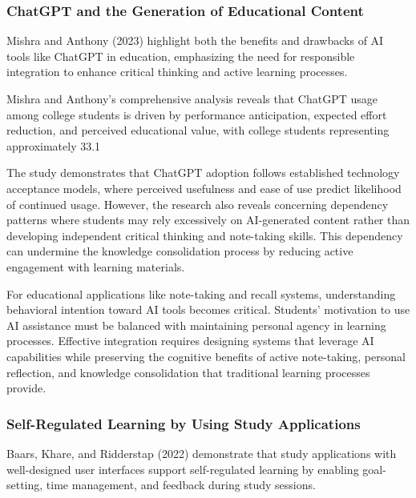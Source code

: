 \subsubsection{ChatGPT and the Generation of Educational Content}

Mishra and Anthony (2023) highlight both the benefits and drawbacks of AI tools like ChatGPT in education, emphasizing the need for responsible integration to enhance critical thinking and active learning processes.

{\color{maroon}
Mishra and Anthony's comprehensive analysis reveals that ChatGPT usage among college students is driven by performance anticipation, expected effort reduction, and perceived educational value, with college students representing approximately 33.1%

The study demonstrates that ChatGPT adoption follows established technology acceptance models, where perceived usefulness and ease of use predict likelihood of continued usage. However, the research also reveals concerning dependency patterns where students may rely excessively on AI-generated content rather than developing independent critical thinking and note-taking skills. This dependency can undermine the knowledge consolidation process by reducing active engagement with learning materials.

For educational applications like note-taking and recall systems, understanding behavioral intention toward AI tools becomes critical. Students' motivation to use AI assistance must be balanced with maintaining personal agency in learning processes. Effective integration requires designing systems that leverage AI capabilities while preserving the cognitive benefits of active note-taking, personal reflection, and knowledge consolidation that traditional learning processes provide.
}

\subsubsection{Self-Regulated Learning by Using Study Applications}

Baars, Khare, and Ridderstap (2022) demonstrate that study applications with well-designed user interfaces support self-regulated learning by enabling goal-setting, time management, and feedback during study sessions.

